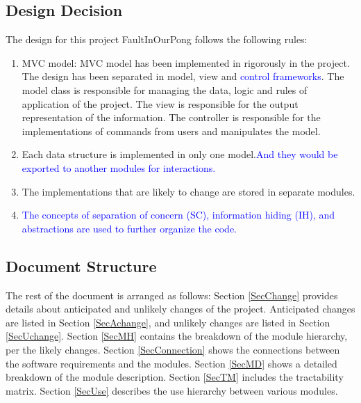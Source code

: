 \documentclass[12pt,letterpaper]{article}
\begin{document}
	\subsection {Design Decision}
	The design for this project FaultInOurPong follows the following rules:
\begin{enumerate}
	\item MVC model: MVC model has been implemented in rigorously in the project. The design has been separated in model, view and \textcolor{blue}{control frameworks}. The model class is responsible for managing the data, logic and rules of application of the project. The view is responsible for the output representation of the information. The controller is responsible for the implementations of commands from users and manipulates the model.
	\item Each data structure is implemented in only one model.\textcolor{blue}{And they would be exported to another modules for interactions.}
	\item The implementations that are likely to change are stored in separate modules.
	\item \textcolor{blue}{The concepts of separation of concern (SC), information hiding (IH), and abstractions are used to further organize the code.}
\end{enumerate}
	\subsection{Document Structure}	
	 
	The rest of the document is arranged as follows: 
	Section \ref{SecChange} provides details about anticipated and unlikely changes of the project. Anticipated changes are listed in Section \ref{SecAchange}, and unlikely changes are listed in Section \ref{SecUchange}.
	Section \ref{SecMH} contains the breakdown of the module hierarchy, per the likely changes. 
	Section \ref{SecConnection} shows the connections between the software requirements and the modules. 
	Section \ref{SecMD} shows a detailed breakdown of the module description. 
	Section \ref{SecTM} includes the tractability matrix. 
	Section \ref{SecUse} describes the use hierarchy between various modules. 
\end{document}
